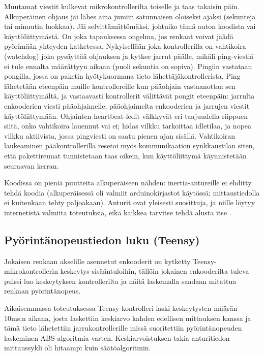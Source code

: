 \documentclass{article}
\begin{document}
Muutamat viestit kulkevat mikrokontrollerilta toiselle ja taas takaisin päin. Alkuperäinen ohjaus jäi lähes aina jumiin satunnaisen oloiseksi ajaksi (sekunteja tai minuutin luokkaa). Jäi selvittämättömäksi, johtuiko tämä auton koodista vai käyttöliittymästä. On joka tapauksessa ongelma, jos renkaat voivat jäädä pyörimään yhteyden katketessa. Nykyisellään joka kontrollerilla on vahtikoira (watchdog) joka pysäyttää ohjauksen ja kytkee jarrut päälle, mikäli ping-viestiä ei tule ennalta määrättyyn aikaan (puoli sekuntia on sopiva). Pingiin vastataan pongilla, jossa on paketin hyötykuormana tieto lähettäjäkontrollerista. Ping lähetetään eteenpäin muille kontrollereille kun pääohjain vastaanottaa sen käyttöliittymältä, ja vastaavasti kontrollerit välittävät pongit eteenpäin: jarrulta enkooderien viesti pääohjaimelle; pääohjaimelta enkooderien ja jarrujen viestit käyttöliittymään. Ohjainten heartbeat-ledit välkkyvät eri taajuudella riippuen siitä, onko vahtikoira lauennut vai ei; hidas vilkku tarkoittaa idletilaa, ja nopea vilkku aktiivista, jossa pingviesti on saatu pienen ajan sisällä. Vahtikoiran laukeaminen pääkontrollerilla resetoi myös kommunikaation synkkaustilan siten, että pakettireunat tunnistetaan taas oikein, kun käyttöliittymä käynnistetään seuraavan kerran.

Koodissa on pieniä puutteita alkuperäiseen nähden: inertia-antureille ei ehditty tehdä koodia (alkuperäisessä oli valmiit arduinokirjastot käytössä; mittaustiedolla ei kuitenkaan tehty paljoakaan). Anturit ovat yleisesti suosittuja, ja niille löytyy internetistä valmiita toteutuksia, eikä kaikkea tarvitse tehdä alusta itse \cite{bib:sparkfunacc} \cite{bib:sparkfungyro}.

\subsection{Pyörintänopeustiedon luku (Teensy)}
Jokaisen renkaan akselille asennetut enkooderit on kytketty Teensy-mikrokontrollerin keskeytys-sisääntuloihin, tällöin jokainen enkooderilta tuleva pulssi luo keskeytyksen kontrollerilta ja näitä laskemalla saadaan mitattua renkaan pyörintänopeus.

Aikaisemmassa toteutuksessa Teensy-kontrolleri laski keskeytysten määrän 10ms:n aikana, josta laskettiin keskiarvo kahden edellisen mittauksen kanssa ja tämä tieto lähetettiin jarrukontrollerille missä suoritettiin pyörintänopeuden laskeminen ABS-algoritmia varten. Keskiarvoistuksen takia anturitiedon mittaussykli oli hitaampi kuin säätöalgoritmin.
\end{document}
